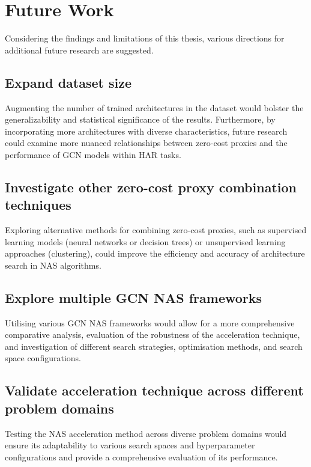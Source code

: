 \section{Future Work}

Considering the findings and limitations of this thesis, various directions for additional future research are suggested.

\subsection{Expand dataset size}
Augmenting the number of trained architectures in the dataset would bolster the generalizability and statistical significance of the results. Furthermore, by incorporating more architectures with diverse characteristics, future research could examine more nuanced relationships between zero-cost proxies and the performance of GCN models within HAR tasks.

\subsection{Investigate other zero-cost proxy combination techniques}
Exploring alternative methods for combining zero-cost proxies, such as supervised learning models (neural networks or decision trees) or unsupervised learning approaches (clustering), could improve the efficiency and accuracy of architecture search in NAS algorithms.

\begin{comment}
\subsection{Develop new zero-cost proxy metrics}
Identifying new zero-cost proxy metrics with stronger correlations to validation accuracy could further enhance the efficacy of combined zero-cost proxy metrics in NAS for GCN.
\end{comment}

\subsection{Explore multiple GCN NAS frameworks}
Utilising various GCN NAS frameworks would allow for a more comprehensive comparative analysis, evaluation of the robustness of the acceleration technique, and investigation of different search strategies, optimisation methods, and search space configurations.

\subsection{Validate acceleration technique across different problem domains}
Testing the NAS acceleration method across diverse problem domains would ensure its adaptability to various search spaces and hyperparameter configurations and provide a comprehensive evaluation of its performance.

